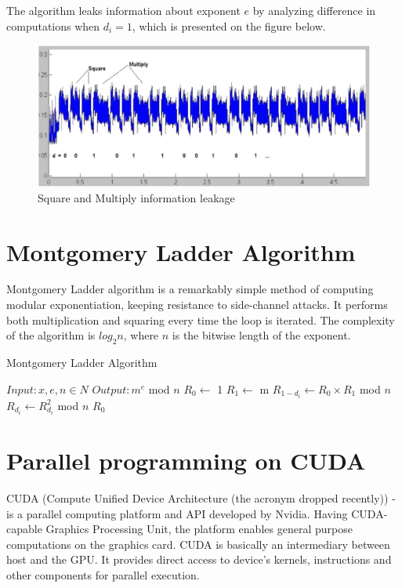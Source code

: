 \documentclass[oneside,openright,12pt,final,en]{mgr}
\begin{document}
The algorithm leaks information about exponent $e$ by analyzing difference in computations when $d_i=1$, which is presented on the figure below.\cite{zz}


\begin{figure}[H]
	\centering
	\includegraphics[width=\textwidth]{double}
	\caption{Square and Multiply information leakage}
	\label{fig:double}
\end{figure}

\section{Montgomery Ladder Algorithm}

Montgomery Ladder algorithm is a remarkably simple method of computing modular exponentiation, keeping resistance to side-channel attacks. It performs both multiplication and squaring every time the loop is iterated. The complexity of the algorithm is $log_2 n$, where $n$ is the bitwise length of the exponent.\cite{zz1}

\begin{algorithm}[H]
	\caption{Montgomery Ladder Algorithm}\label{ml}
	\begin{algorithmic}[1]
		
		\State $Input: x,e,n \in N$
		\State $Output: m^e$ mod $n$
		\State $ R_0 \gets$ 1
		\State $ R_1 \gets$ m
		\State  $ R_{1-d_i} \gets R_0 \times R_1$ mod $n$
		\State  $ R_{d_i} \gets R_{d_i}^2$ mod $n$		
		\EndFor
		\State
		\Return $R_0$
	\end{algorithmic}
\end{algorithm}



\section{Parallel programming on CUDA}

CUDA (Compute Unified Device Architecture (the acronym dropped recently)) - is a parallel computing platform and API developed by Nvidia.
Having CUDA-capable Graphics Processing Unit, the platform enables general purpose computations on the graphics card. CUDA is basically an intermediary between host and the GPU. It provides direct access to device's kernels, instructions and other components for parallel execution. 
\end{document}
